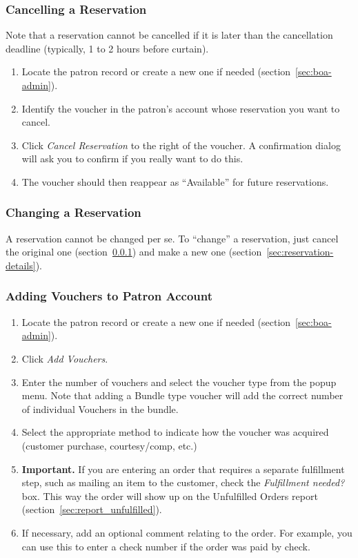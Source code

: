 \subsubsection{Cancelling a Reservation}
\label{sec:cancelling}

Note that a reservation cannot be cancelled if it is later than the
cancellation deadline (typically, 1 to 2 hours before curtain).


\begin{enumerate}
\item Locate the patron record or create a new one if needed
  (section~\ref{sec:boa-admin}). 
\item Identify the voucher in the patron's account whose reservation you
  want to cancel.
\item Click \emph{Cancel Reservation} to the right of the voucher.  A
  confirmation dialog will ask you to confirm if you really want to do
  this.
\item The voucher should then reappear as ``Available'' for future
  reservations. 
\end{enumerate}

\subsubsection{Changing a Reservation}

A reservation cannot be changed per se.  To ``change'' a reservation,
just cancel the original one (section~\ref{sec:cancelling}) and make a
new one (section~\ref{sec:reservation-details}).

\subsubsection{Adding Vouchers to Patron Account}

\begin{enumerate}
\item  Locate the patron record or create a new one if needed
  (section~\ref{sec:boa-admin}). 
\item Click \emph{Add Vouchers}.
\item Enter the number of vouchers and select the voucher type from the
  popup menu.  Note that adding a Bundle type voucher will add the
  correct number of individual Vouchers in the bundle.
\item Select the appropriate method to indicate how the voucher was
  acquired (customer purchase, courtesy/comp, etc.)
\item \textbf{Important.}  If you are entering an order that requires a
  separate fulfillment step, such as mailing an item to the customer,
  check the \emph{Fulfillment needed?} box.  This way the order will
  show up on the Unfulfilled Orders report (section~\ref{sec:report_unfulfilled}).
\item If necessary, add an optional comment relating to the order. For
  example, you can use this to enter a check number if the order was
  paid by check.
\end{enumerate}

